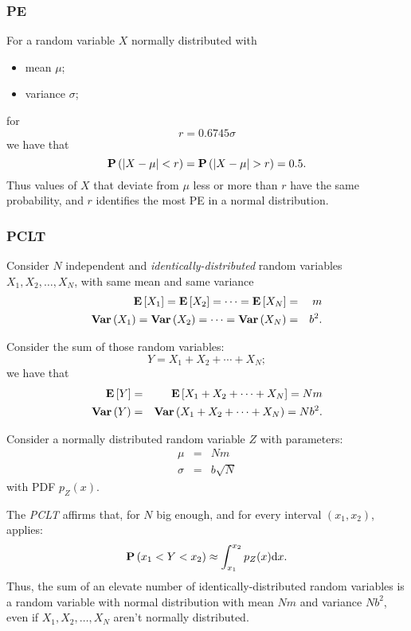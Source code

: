 \documentclass[dissertation.tex]{subfiles}
\begin{document}
\subsubsection{\ac{PE}}
For a random variable $X$ normally distributed with
\begin{itemize}
\item mean $\mu$;
\item variance $\sigma$;
\end{itemize}
for
\begin{equation*}
  r=0.6745\sigma
\end{equation*}
we have that
\begin{equation*}
  \prob{\abs{X-\mu}<r} = \prob{\abs{X-\mu}>r} = 0.5.
\end{equation*}
Thus values of $X$ that deviate from $\mu$ less or more than $r$ have the
same probability, and $r$ identifies the most \ac{PE} in a
normal distribution.
\subsubsection{\acf{PCLT}}
Consider $N$ independent and \emph{identically-distributed} random variables
$X_1,X_2,\dots,X_N$, with same mean and same variance
\begin{eqnarray*}
  \mathrm{\textbf{E}}\left[X_1\right]=\mathrm{\textbf{E}}\left[X_2\right]=\dots=\mathrm{\textbf{E}}\left[X_N\right]&=&m\\
  \mathrm{\textbf{Var}}\left(X_1\right)=\mathrm{\textbf{Var}}\left(X_2\right)=\dots=\mathrm{\textbf{Var}}\left(X_N\right)&=&b^2.
\end{eqnarray*}

Consider the sum of those random variables:
\begin{equation*}
  Y = X_1+X_2+\cdots+X_N;
\end{equation*}
we have that
\begin{eqnarray*}
  \mathrm{\textbf{E}}\left[Y\right]&=&\mathrm{\textbf{E}}\left[X_1+X_2+\cdots+X_N\right]=Nm\\
  \mathrm{\textbf{Var}}\left(Y\right)&=&\mathrm{\textbf{Var}}\left(X_1+X_2+\cdots+X_N\right)=Nb^2.
\end{eqnarray*}

Consider a normally distributed random variable $Z$ with
parameters:
\begin{eqnarray*}
  \mu&=&Nm\\
  \sigma&=&b\sqrt{N}
\end{eqnarray*}
with \ac{PDF} $p_Z(x)$.

The \emph{\ac{PCLT}} affirms that, for $N$ big
enough, and for every interval $(x_1,x_2)$, applies:
\begin{equation}\label{eq:tcl}
  \mathrm{\textbf{P}}\left(x_1<Y<x_2\right)\approx\int_{x_1}^{x_2}p_Z(x) \mathrm{d} x.
\end{equation}
Thus, the sum of an elevate number of identically-distributed random
variables is a random variable with normal distribution with mean $Nm$
and variance $Nb^2$, even if
$X_1,X_2,\dots,X_N$ aren't normally distributed.
\end{document}
